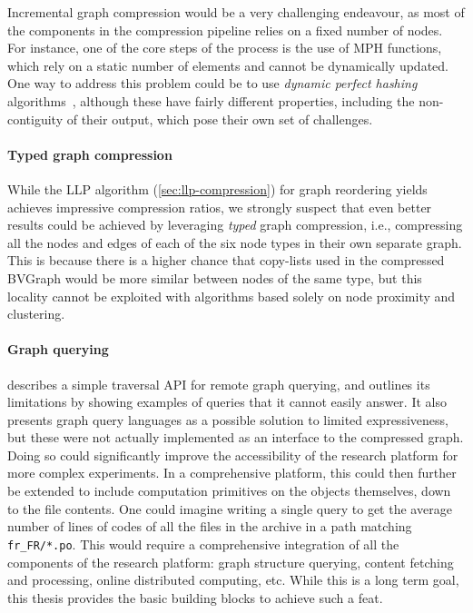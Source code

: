 Incremental graph compression would be a very challenging endeavour, as most of
the components in the compression pipeline relies on a fixed number of nodes.
For instance, one of the core steps of the process is the use of \gls{MPH}
functions, which rely on a static number of elements and cannot be dynamically
updated. One way to address this problem could be to use \emph{dynamic perfect
hashing} algorithms~\cite{fredman1984storing,dietzfelbinger1994dynamic},
although these have fairly different properties, including the non-contiguity
of their output, which pose their own set of challenges.

\paragraph*{Typed graph compression}

While the \gls{LLP} algorithm (\cref{sec:llp-compression}) for graph reordering
yields achieves impressive compression ratios, we strongly suspect that even
better results could be achieved by leveraging \emph{typed} graph compression,
i.e., compressing all the nodes and edges of each of the six node types in
their own separate graph. This is because there is a higher chance that
copy-lists used in the compressed BVGraph would be more similar between nodes
of the same type, but this locality cannot be exploited with algorithms based
solely on node proximity and clustering.

\paragraph*{Graph querying}

 describes a simple traversal API for remote graph
querying, and outlines its limitations by showing examples of queries that it
cannot easily answer. It also presents graph query languages as a possible
solution to limited expressiveness, but these were not actually implemented as
an interface to the compressed graph. Doing so could significantly improve the
accessibility of the research platform for more complex experiments. In a
comprehensive platform, this could then further be extended to include
computation primitives on the objects themselves, down to the file contents.
One could imagine writing a single query to get the average number of lines of
codes of all the files in the archive in a path matching
\texttt{fr_FR/*.po}.  This would require a comprehensive integration
of all the components of the research platform: graph structure querying,
content fetching and processing, online distributed computing, etc. While this
is a long term goal, this thesis provides the basic building blocks to achieve
such a feat.

